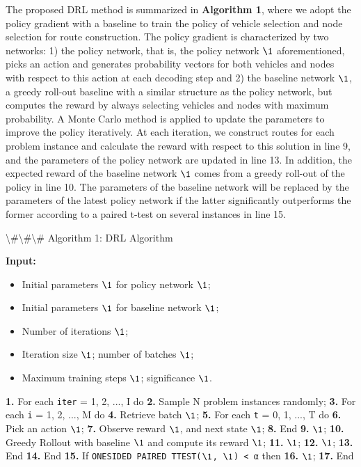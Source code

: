 \documentclass{article}
\begin{document}
	The proposed DRL method is summarized in \textbf{Algorithm 1}, where we adopt the policy gradient with a baseline to train the policy of vehicle selection and node selection for route construction. The policy gradient is characterized by two networks: 1) the policy network, that is, the policy network $\1$ aforementioned, picks an action and generates probability vectors for both vehicles and nodes with respect to this action at each decoding step and 2) the baseline network $\1$, a greedy roll-out baseline with a similar structure as the policy network, but computes the reward by always selecting vehicles and nodes with maximum probability. A Monte Carlo method is applied to update the parameters to improve the policy iteratively. At each iteration, we construct routes for each problem instance and calculate the reward with respect to this solution in line 9, and the parameters of the policy network are updated in line 13. In addition, the expected reward of the baseline network $\1$ comes from a greedy roll-out of the policy in line 10. The parameters of the baseline network will be replaced by the parameters of the latest policy network if the latter significantly outperforms the former according to a paired t-test on several instances in line 15.
	
	\textbackslash{}#\textbackslash{}#\textbackslash{}# Algorithm 1: DRL Algorithm
	
	\textbf{Input:}  
	\begin{itemize}
		\item Initial parameters $\1$ for policy network $\1$;  
		\item Initial parameters $\1$ for baseline network $\1$;  
		\item Number of iterations $\1$;  
		\item Iteration size $\1$; number of batches $\1$;  
		\item Maximum training steps $\1$; significance $\1$.
	\end{itemize}
	
	\textbf{1.} For each \texttt{iter} = 1, 2, ..., I do  
	\textbf{2.} Sample N problem instances randomly;  
	\textbf{3.} For each \texttt{i} = 1, 2, ..., M do  
	\textbf{4.} Retrieve batch $\1$;  
	\textbf{5.} For each \texttt{t} = 0, 1, ..., T do  
	\textbf{6.} Pick an action $\1$;  
	\textbf{7.} Observe reward $\1$, and next state $\1$;  
	\textbf{8.} End  
	\textbf{9.} $\1$;  
	\textbf{10.} Greedy Rollout with baseline $\1$ and compute its reward $\1$;  
	\textbf{11.} $\1$;  
	\textbf{12.} $\1$;  
	\textbf{13.} End  
	\textbf{14.} End  
	\textbf{15.} If \texttt{ONESIDED PAIRED TTEST($\1$, $\1$) < α} then  
	\textbf{16.} $\1$;  
	\textbf{17.} End  
	
\end{document}
